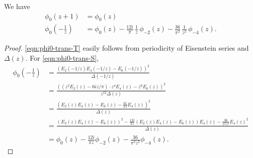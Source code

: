 \begin{lemma}\label{lemma:phi0-transform}
We have
\begin{align}
    \phi_0(z + 1) &= \phi_0(z) \label{eqn:phi0-trans-T} \\
    \phi_0\left(-\frac{1}{z}\right) &= \phi_0(z)-\frac{12i}{\pi}\,\frac{1}{z}\,\phi_{-2}(z)-\frac{36}{\pi^2}\,\frac{1}{z^2}\,\phi_{-4}(z).\label{eqn:phi0-trans-S}
\end{align}
\end{lemma}
\begin{proof}
\eqref{eqn:phi0-trans-T} easily follows from periodicity of Eisenstein series and $\Delta(z)$.
For \eqref{eqn:phi0-trans-S},
\begin{align}
    \phi_{0}\left(-\frac{1}{z}\right) &= \frac{(E_2(-1/z) E_4(-1/z) - E_6(-1/z))^{2}}{\Delta(-1/z)} \\
    &= \frac{((z^2 E_2(z) - 6iz / \pi) \cdot z^4 E_4(z) - z^6 E_6(z))^{2}}{z^{12} \Delta(z)} \\
    &= \frac{\left(E_2(z) E_4(z) - E_6(z) - \frac{6i}{\pi z} E_4(z)\right)^2}{\Delta(z)} \\
    &= \frac{(E_2(z) E_4(z) - E_6(z))^{2} - \frac{12i}{\pi z}(E_2(z) E_4(z) - E_6(z)) E_4(z) - \frac{36}{\pi^2 z^2} E_4(z)^{2}}{\Delta(z)} \\
    &= \phi_0(z) - \frac{12 i}{\pi z} \phi_{-2}(z) - \frac{36}{\pi^2 z^2} \phi_{-4}(z).
\end{align}
\end{proof}

